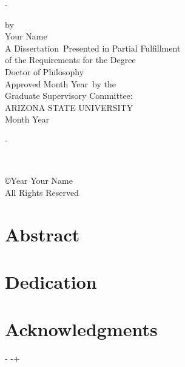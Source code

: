 \documentclass[letterpaper,             %
               oneside,                 %
               \pointsize]              %
               {memoir}
\newcommand*\Author{Your Name}                      %
\newcommand*{\documentname}%
  {Dissertation}                        %
\newcommand*{\degreename}
  {Doctor of Philosophy}                %
\newcommand*\defdate{Month Year}                       %
\newcommand*{\chairlabel}{Chair}        %
\newcommand*{\gradmonth}{Month}         %
\newcommand*{\gradyear}{Year}           %
\newcommand*{\graddate}{\gradmonth%
  \space\gradyear}
\newlength{\savedfootskip}
\newcommand{\titlepagesetup}{%
  \changepage%
    {\savedfootskip}%
    {}%
    {}%
    {}%
    {}%
    {}%
    {}%
    {}%
    {-\savedfootskip}%
}
\newcommand{\closetitlepagesetup}{%
  \changepage{-\savedfootskip}{}{}{}{}%
    {}{}{}{\savedfootskip}%
}
\newcommand*{\titlepageASU}{
  \titlepagesetup
  \clearpage
  \begin{center}
  \SingleSpacing
  \thispagestyle{empty}
    \renewcommand*{\do}[1]{##1 \\[\baselineskip]} 
    \dolistloop{\titlelines}
    by \\[\baselineskip]
    \Author \\[4\baselineskip]
    A \documentname~Presented in Partial Fulfillment \\
    of the Requirements for the Degree \\
    \degreename \\
    \vfill                              %
    Approved \defdate~by the \\
    Graduate Supervisory Committee: \\[\baselineskip]
    \renewcommand*{\do}[1]{##1, \chairlabel \\} 
    \dolistloop{\committeechair} 
    \renewcommand*{\do}[1]{##1 \\} 
    \dolistloop{\committeemember}
    \vfill                              %
    ARIZONA STATE UNIVERSITY \\[\baselineskip]
    \graddate
  \end{center}
  \clearpage
  \closetitlepagesetup
}
\newlength{\verticalpush}               %
\newcommand{\contentslistsetup}{%
  \changepage%
    {-\baselineskip}%
    {}%
    {}%
    {}%
    {}%
    {\verticalpush}%
    {}%
    {}%
    {-\verticalpush+\baselineskip}%
}
\renewcommand*{\do}[1]{#1\ }%
\renewcommand*{\do}[1]{{#1}\ }%
\newcommand{\copyrightpageASU}{%
  \thispagestyle{empty}
  \titlepagesetup 
  ~\\ \vfill
    \begin{center}
      \copyright\gradyear\space%
      \Author\\%
      All Rights Reserved%
    \end{center}%
  \clearpage%
  \closetitlepagesetup 
}
\begin{document}
\titlepageASU

\copyrightpageASU                       %

\pagestyle{ASU}
\frontmatter

\chapter*{Abstract}                     %

\chapter*{Dedication}                   %

\chapter*{Acknowledgments}              %

\iftoggle{usemicrotype}                 %
  {\microtypesetup{protrusion=false}}%
  {}
\clearpage                              %
\contentslistsetup                      %
\end{document}
